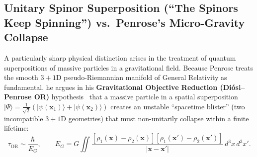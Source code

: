 \documentclass[11pt,a4paper]{article}
\begin{document}
\subsection*{Unitary Spinor Superposition (``The Spinors Keep Spinning'') vs.\ Penrose's Micro-Gravity Collapse}
A particularly sharp physical distinction arises in the treatment of quantum superpositions of massive particles in a gravitational field. Because Penrose treats the smooth $3+1\text{D}$ pseudo-Riemannian manifold of General Relativity as fundamental, he argues in his \textbf{Gravitational Objective Reduction (Diósi--Penrose OR)} hypothesis~\cite{PenroseOR1996,Diosi1989} that a massive particle in a spatial superposition $|\Psi\rangle = \frac{1}{\sqrt{2}}(|\psi(\mathbf{x}_1)\rangle + |\psi(\mathbf{x}_2)\rangle)$ creates an unstable ``spacetime blister'' (two incompatible $3+1\text{D}$ geometries) that must non-unitarily collapse within a finite lifetime:
\begin{equation}
\tau_{\text{OR}} \sim \frac{\hbar}{E_G}, \qquad E_G = G \iint \frac{[\rho_1(\mathbf{x}) - \rho_2(\mathbf{x})][\rho_1(\mathbf{x}') - \rho_2(\mathbf{x}')]}{|\mathbf{x} - \mathbf{x}'|}\, d^3x\, d^3x'.
\end{equation}
\end{document}

